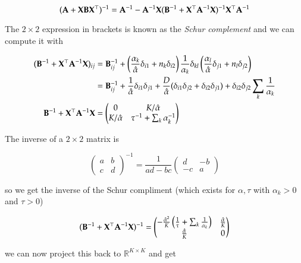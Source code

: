 \begin{equation}
	({\mathbf{A}} + {\mathbf{X}}{\mathbf{B}}{\mathbf{X}}^\top)^{-1} = {\mathbf{A}}^{-1} - {\mathbf{A}}^{-1} {\mathbf{X}} ({\mathbf{B}}^{-1} + {\mathbf{X}}^\top {\mathbf{A}}^{-1} {\mathbf{X}})^{-1} {\mathbf{X}}^\top {\mathbf{A}}^{-1}
\end{equation}

The $2 \times 2$ expression in brackets is known as the \textit{Schur complement} and we can compute it with

\begin{align}
	({\mathbf{B}}^{-1} + {\mathbf{X}}^\top {\mathbf{A}}^{-1} {\mathbf{X}})_{ij} &= {\mathbf{B}}^{-1}_{ij} + \left(\frac{\alpha_k}{\hat{\alpha}}\delta_{i1} + n_k\delta_{i2}\right) \frac{1}{\alpha_k} \delta_{kl} \left(\frac{\alpha_l}{\hat{\alpha}}\delta_{j1} + n_l \delta_{j2} \right) \\
	 &= {\mathbf{B}}^{-1}_{ij} + \frac{1}{\hat{\alpha}}\delta_{i1} \delta_{j1} + \frac{D}{\hat{\alpha}}(\delta_{i1}\delta_{j2} + \delta_{i2}\delta_{j1}) + \delta_{i2} \delta_{j2} \sum_k \frac{1}{\alpha_k} \\
	 {\mathbf{B}}^{-1} + {\mathbf{X}}^\top {\mathbf{A}}^{-1} {\mathbf{X}} &= \begin{pmatrix}
		 0 & K/\hat{\alpha} \\
		 K/\hat{\alpha} & \tau^{-1} + \sum_k \alpha_k^{-1}
	 \end{pmatrix}
\end{align}

The inverse of a $2\times 2$ matrix is

\begin{equation}
	\begin{pmatrix}
		a & b \\
		c & d
	\end{pmatrix}^{-1} = \frac{1}{ad - bc} \begin{pmatrix}
		d & -b \\
		-c & a
	\end{pmatrix}
\end{equation}

so we get the inverse of the Schur compliment (which exists for $\alpha, \tau$ with $\alpha_k > 0$ and $\tau > 0$)

\begin{equation}
	({\mathbf{B}}^{-1} + {\mathbf{X}}^\top {\mathbf{A}}^{-1} {\mathbf{X}})^{-1} = \begin{pmatrix}
		-\frac{\hat{\alpha}^2}{K}\left(\frac{1}{\tau} + \sum_k \frac{1}{\alpha_k} \right) & \frac{\hat{\alpha}}{K} \\
		\frac{\hat{\alpha}}{K} & 0 
	\end{pmatrix}
\end{equation}

we can now project this back to $\mathbb{R}^{K\times K}$ and get

